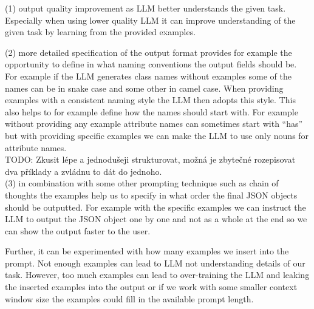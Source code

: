 (1) output quality improvement as LLM better understands the given task. Especially when using lower quality LLM it can improve understanding of the given task by learning from the provided examples.

(2) more detailed specification of the output format provides for example the opportunity to define in what naming conventions the output fields should be. For example if the LLM generates class names without examples some of the names can be in snake case and some other in camel case. When providing examples with a consistent naming style the LLM then adopts this style. This also helps to for example define how the names should start with. For example without providing any example attribute names can sometimes start with ``has'' but with providing specific examples we can make the LLM to use only nouns for attribute names. \\

TODO: Zkusit lépe a jednodušeji strukturovat, možná je zbytečné rozepisovat dva příklady a zvládnu to dát do jednoho. \\

(3) in combination with some other prompting technique such as chain of thoughts the examples help us to specify in what order the final JSON objects should be outputted. For example with the specific examples we can instruct the LLM to output the JSON object one by one and not as a whole at the end so we can show the output faster to the user.

Further, it can be experimented with how many examples we insert into the prompt. Not enough examples can lead to LLM not understanding details of our task. However, too much examples can lead to over-training the LLM and leaking the inserted examples into the output or if we work with some smaller context window size the examples could fill in the available prompt length.